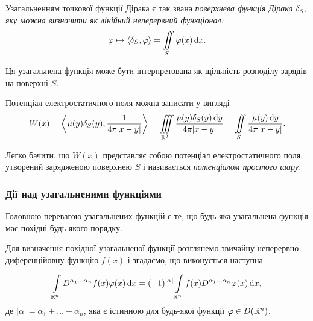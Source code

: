 \begin{definition}
	Узагальненням точкової функції Дірака є так звана \it{поверхнева функція Дірака} $\delta_S$, яку можна визначити як лінійний неперервний функціонал:
	\begin{equation}
		\phi \mapsto \langle \delta_S, \phi \rangle = \Iint_{S} \phi(x) \diff x.	
	\end{equation}
\end{definition}

\begin{remark}
	Ця узагальнена функція може бути інтерпретована як щільність розподілу зарядів на поверхні $S$.
\end{remark}

\begin{example}
	Потенціал електростатичного поля можна записати у вигляді
	\begin{equation}
		W(x) = \langle \mu(y) \delta_S(y), \frac{1}{4 \pi |x - y|} \rangle = \Iiint_{\RR^3} \frac{\mu(y) \delta_S(y) \diff y}{4 \pi |x - y|} = \Iint_{S} \frac{\mu(y) \diff y}{4 \pi |x - y|}.	
	\end{equation}
\end{example}

\begin{definition}
	Легко бачити, що $W(x)$ представляє собою потенціал електростатичного поля, утворений зарядженою поверхнею $S$ і називається \it{потенціалом простого шару}.
\end{definition}

\subsubsection{Дії над узагальненими функціями}

Головною перевагою узагальнених функцій є те, що будь-яка узагальнена функція має похідні будь-якого порядку. \medskip

Для визначення похідної узагальненої функції розглянемо звичайну неперервно диференційовну функцію $f(x)$ і згадаємо, що виконується наступна
\begin{th_formula}
	\begin{equation}
		\displaystyle\int\limits_{\mathbb{R}^n} D^{\alpha_1 \ldots \alpha_n} f(x) \varphi(x) \mathop{}\!\mathrm{d} x = (-1)^{|\alpha|} \displaystyle\int\limits_{\mathbb{R}^n} f(x) D^{\alpha_1 \ldots \alpha_n} \varphi(x) \mathop{}\!\mathrm{d} x,
	\end{equation}
	де $|\alpha| = \alpha_1 + \ldots + \alpha_n$, яка є істинною для будь-якої функції $\varphi \in D(\mathbb{R}^n)$.
\end{th_formula}

